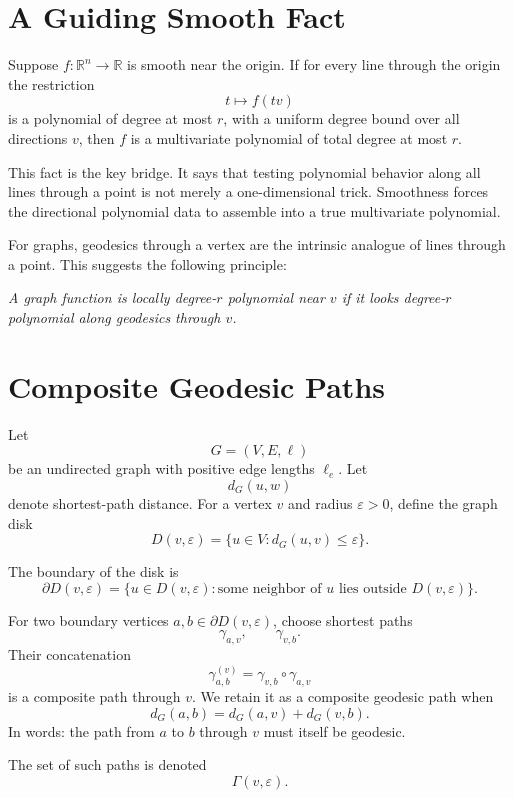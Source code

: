 \documentclass[11pt]{article}
\newcommand{\R}{\mathbb R}
\newcommand{\Geo}{\Gamma}
\newcommand{\eps}{\varepsilon}
\begin{document}
\section{A Guiding Smooth Fact}

Suppose \(f:\R^n\to\R\) is smooth near the origin.  If for every line through
the origin the restriction
\[
  t \mapsto f(tv)
\]
is a polynomial of degree at most \(r\), with a uniform degree bound over all
directions \(v\), then \(f\) is a multivariate polynomial of total degree at
most \(r\).

This fact is the key bridge.  It says that testing polynomial behavior along
all lines through a point is not merely a one-dimensional trick.  Smoothness
forces the directional polynomial data to assemble into a true multivariate
polynomial.

For graphs, geodesics through a vertex are the intrinsic analogue of lines
through a point.  This suggests the following principle:

\begin{center}
\begin{minipage}{0.82\linewidth}
\itshape
A graph function is locally degree-\(r\) polynomial near \(v\) if it looks
degree-\(r\) polynomial along geodesics through \(v\).
\end{minipage}
\end{center}

\section{Composite Geodesic Paths}

Let
\[
  G=(V,E,\ell)
\]
be an undirected graph with positive edge lengths \(\ell_e\).  Let
\[
  d_G(u,w)
\]
denote shortest-path distance.  For a vertex \(v\) and radius \(\eps>0\), define
the graph disk
\[
  D(v,\eps)=\{u\in V: d_G(u,v)\le \eps\}.
\]

The boundary of the disk is
\[
  \partial D(v,\eps)
  =
  \{u\in D(v,\eps): \text{some neighbor of }u\text{ lies outside }D(v,\eps)\}.
\]

For two boundary vertices \(a,b\in \partial D(v,\eps)\), choose shortest paths
\[
  \gamma_{a,v},\qquad \gamma_{v,b}.
\]
Their concatenation
\[
  \gamma_{a,b}^{(v)}
  =
  \gamma_{v,b}\circ \gamma_{a,v}
\]
is a composite path through \(v\).  We retain it as a composite geodesic path
when
\[
  d_G(a,b)=d_G(a,v)+d_G(v,b).
\]
In words: the path from \(a\) to \(b\) through \(v\) must itself be geodesic.

The set of such paths is denoted
\[
  \Geo(v,\eps).
\]
\end{document}
